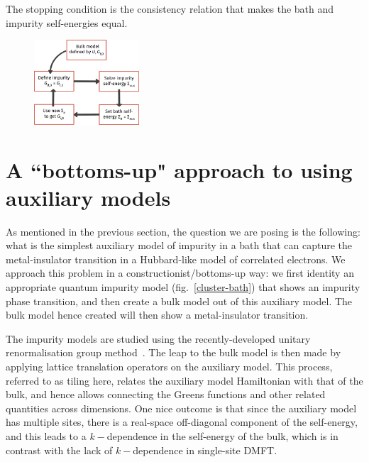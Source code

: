 \documentclass[reprint,hidelinks]{revtex4-2}
\begin{document}
The stopping condition is the consistency relation that makes the bath and impurity self-energies equal.

\begin{figure}[!htb]
	\centering
	\includegraphics[width=0.35\textwidth]{dmft_scheme.pdf}
\end{figure}


\section{A ``bottoms-up" approach to using auxiliary models}
As mentioned in the previous section, the question we are posing is the following: what is the simplest auxiliary model of impurity in a bath that can capture the metal-insulator transition in a Hubbard-like model of correlated electrons. We approach this problem in a constructionist/bottoms-up way: we first identity an appropriate quantum impurity model (fig.~\ref{cluster-bath}) that shows an impurity phase transition, and then create a bulk model out of this auxiliary model. The bulk model hence created will then show a metal-insulator transition. 

The impurity models are studied using the recently-developed unitary renormalisation group method~\cite{anirbanmott1,anirbanmott2,anirbanurg1,anirbanurg2,siddharthacpi,santanukagome}. The leap to the bulk model is then made by applying lattice translation operators on the auxiliary model. This process, referred to as tiling here, relates the auxiliary model Hamiltonian with that of the bulk, and hence allows connecting the Greens functions and other related quantities across dimensions. One nice outcome is that since the auxiliary model has multiple sites, there is a real-space off-diagonal component of the self-energy, and this leads to a \(k-\)dependence in the self-energy of the bulk, which is in contrast with the lack of \(k-\)dependence in single-site DMFT.  
\end{document}
